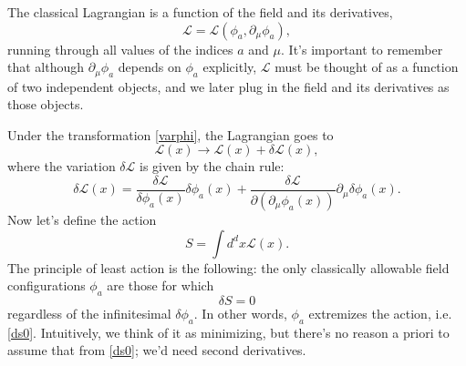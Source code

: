 \documentclass[main.tex]{subfiles}
\begin{document}
The classical Lagrangian is a function of the field and its derivatives,
\[
\mathcal{L} = \mathcal{L} (\phi_a, \partial_\mu \phi_a),
\]
running through all values of the indices $a$ and $\mu$. It's important to remember that although $\partial_\mu \phi_a$ depends on $\phi_a$ explicitly, $\mathcal{L}$ must be thought of as a function of two independent objects, and we later plug in the field and its derivatives as those objects.

Under the transformation \ref{varphi}, the Lagrangian goes to 
\[
\mathcal{L}(x) \to \mathcal{L}(x) + \delta \mathcal{L}(x),
\]
where the variation $\delta \mathcal{L}$ is given by the chain rule:
\begin{equation} \label{varL}
\delta \mathcal{L} (x) = \frac{\delta \mathcal{L}}{\delta \phi_a (x)} \delta \phi_a (x) + \frac{\delta \mathcal{L}}{\partial (\partial_\mu \phi_a (x))} \partial_\mu \delta \phi_a (x).
\end{equation}
Now let's define the action
\[
S = \int d^d x \mathcal{L} (x).
\]
The principle of least action is the following: the only classically allowable field configurations $\phi_a$ are those for which 
\begin{equation} \label{ds0}
\delta S = 0
\end{equation}
regardless of the infinitesimal $\delta \phi_a$. In other words, $\phi_a$ extremizes the action, i.e. \ref{ds0}. Intuitively, we think of it as minimizing, but there's no reason a priori to assume that from \ref{ds0}; we'd need second derivatives.
\end{document}

